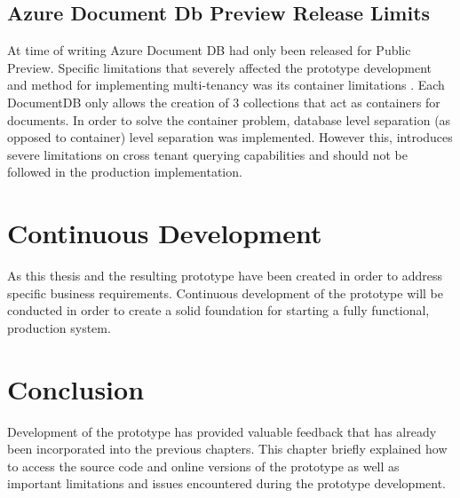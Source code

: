 \subsection{Azure Document Db Preview Release Limits}
At time of writing Azure Document DB had only been released for Public Preview. Specific limitations that severely affected the prototype development and method for implementing multi-tenancy  was its container limitations \cite{AzureLimits}. Each DocumentDB only allows the creation of 3 collections that act as containers for documents. In order to solve the container problem, database level separation (as opposed to container) level separation was implemented. However this, introduces severe limitations on cross tenant querying capabilities and should not be followed in the production implementation.

\section{Continuous Development}
As this thesis and the resulting prototype have been created in order to address specific business requirements. Continuous development of the prototype will be conducted in order to create a solid foundation for starting a fully functional, production system.

\section{Conclusion}
Development of the prototype has provided valuable feedback that has already been incorporated into the previous chapters. This chapter briefly explained how to access the source code and online versions of the prototype as well as important limitations and issues encountered during the prototype development. 
